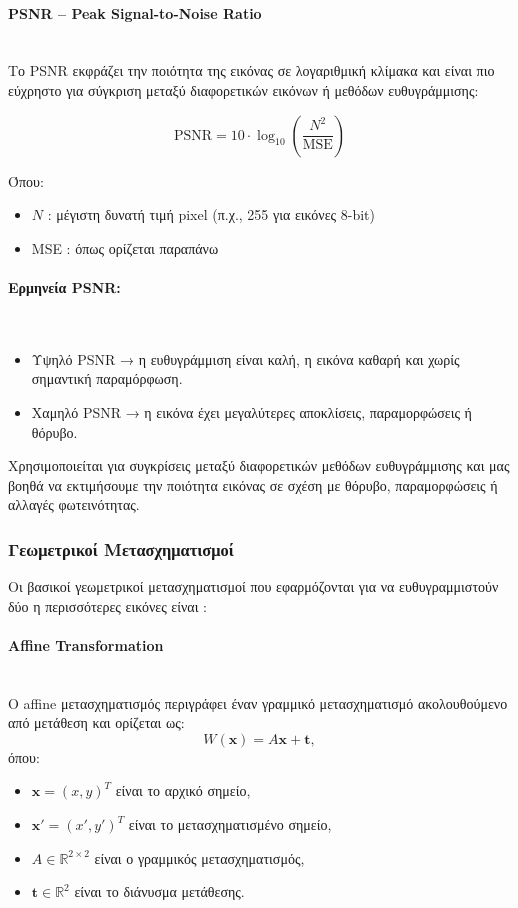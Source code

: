 \documentclass[12pt]{article}
\begin{document}
\paragraph{PSNR – Peak Signal-to-Noise Ratio }
\mbox{}\\
Το PSNR εκφράζει την ποιότητα της εικόνας σε λογαριθμική κλίμακα και είναι πιο εύχρηστο για σύγκριση μεταξύ διαφορετικών εικόνων ή μεθόδων ευθυγράμμισης:

\begin{equation}
\text{PSNR} = 10 \cdot \log_{10} \left( \frac{N^2}{\text{MSE}} \right)
\end{equation}

Όπου:
\begin{itemize}
  \item $N$ : μέγιστη δυνατή τιμή pixel (π.χ., 255 για εικόνες 8-bit)
  \item MSE : όπως ορίζεται παραπάνω
\end{itemize}

\paragraph{Ερμηνεία PSNR:}
\mbox{}\\
\begin{itemize}
  \item Υψηλό PSNR → η ευθυγράμμιση είναι καλή, η εικόνα καθαρή και χωρίς σημαντική παραμόρφωση.
  \item Χαμηλό PSNR → η εικόνα έχει μεγαλύτερες αποκλίσεις, παραμορφώσεις ή θόρυβο.
\end{itemize}

Χρησιμοποιείται για συγκρίσεις μεταξύ διαφορετικών μεθόδων ευθυγράμμισης και μας βοηθά να εκτιμήσουμε την ποιότητα εικόνας σε σχέση με θόρυβο, παραμορφώσεις ή αλλαγές φωτεινότητας.




\subsubsection{Γεωμετρικοί Μετασχηματισμοί}
Οι βασικοί γεωμετρικοί μετασχηματισμοί που εφαρμόζονται για να ευθυγραμμιστούν δύο η περισσότερες εικόνες είναι :
\paragraph{Affine Transformation}
\mbox{}\\
Ο affine μετασχηματισμός περιγράφει έναν γραμμικό μετασχηματισμό ακολουθούμενο από μετάθεση και ορίζεται ως:
\[
W(\mathbf{x}) = A\mathbf{x} + \mathbf{t},
\]
όπου:
\begin{itemize}
    \item \(\mathbf{x} = (x,y)^T\) είναι το αρχικό σημείο,
    \item \(\mathbf{x}' = (x',y')^T\) είναι το μετασχηματισμένο σημείο,
    \item \(A \in \mathbb{R}^{2 \times 2}\) είναι ο γραμμικός μετασχηματισμός,
    \item \(\mathbf{t} \in \mathbb{R}^2\) είναι το διάνυσμα μετάθεσης.
\end{itemize}
\end{document}
